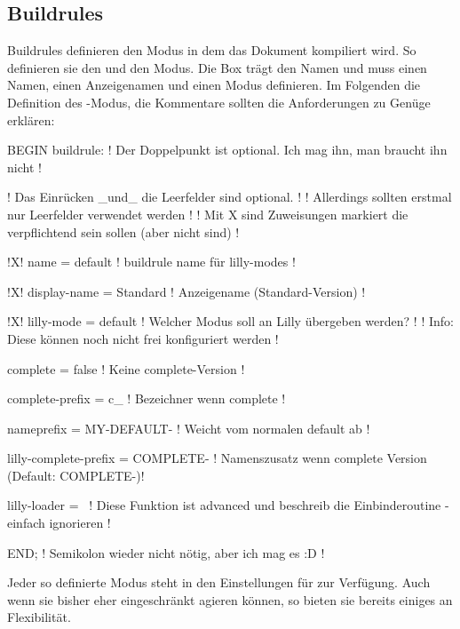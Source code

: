 \subsection{Buildrules}
Buildrules definieren den Modus in dem das Dokument kompiliert wird. So definieren sie den  und den  Modus. Die Box trägt den Namen  und muss einen Namen, einen Anzeigenamen und einen Modus definieren. Im Folgenden die Definition des -Modus, die Kommentare sollten die Anforderungen zu Genüge erklären:
{%
\begin{plaingepard}
BEGIN buildrule: ! Der Doppelpunkt ist optional. Ich mag ihn, man braucht ihn nicht !

    ! Das Einrücken _und_ die Leerfelder sind optional. !
    ! Allerdings sollten erstmal nur Leerfelder verwendet werden !
    ! Mit X sind Zuweisungen markiert die verpflichtend sein sollen (aber nicht sind) !

!X!  name                   = default     ! buildrule name für lilly-modes !

!X!  display-name           = Standard    ! Anzeigename (Standard-Version) !

!X!  lilly-mode             = default     ! Welcher Modus soll an Lilly übergeben werden? !
                                          ! Info: Diese können noch nicht frei konfiguriert werden !

     complete               = false       ! Keine complete-Version !
 
     complete-prefix        = c_          ! Bezeichner wenn complete !
 
     nameprefix             = MY-DEFAULT- ! Weicht vom normalen default ab !
 
     lilly-complete-prefix  = COMPLETE-   ! Namenszusatz wenn complete Version (Default: COMPLETE-)!
 
     lilly-loader           = \
                    ! Diese Funktion ist advanced und beschreib die Einbinderoutine - einfach 
                      ignorieren !

END; ! Semikolon wieder nicht nötig, aber ich mag es :D !
\end{plaingepard}
}
Jeder so definierte Modus steht in den Einstellungen für  zur Verfügung. Auch wenn sie bisher eher eingeschränkt agieren können, so bieten sie bereits einiges an Flexibilität.

